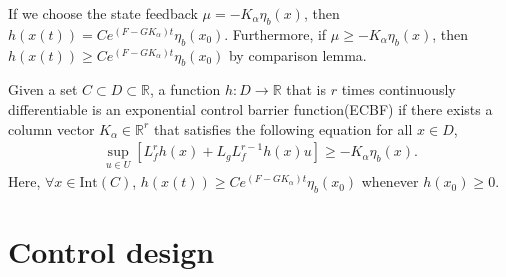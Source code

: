 If we choose the state feedback $ \mu = - K_{\alpha} \eta_b (x) $, then $ h(x(t)) = C e^{(F - GK_{\alpha})t} \eta_b (x_0) $.
Furthermore, if $ \mu \geq -K_{\alpha} \eta_b (x) $, then $ h(x(t)) \geq C e^{(F - GK_{\alpha})t} \eta_b (x_0) $ by comparison lemma.

\begin{definition}
    Given a set $ C \subset D \subset \mathbb{R} $, a function $ h : D \rightarrow \mathbb{R} $ that is $ r $ times continuously differentiable is an exponential control barrier function(ECBF) if there exists a column vector $ K_{\alpha} \in \mathbb{R}^r $ that satisfies the following equation for all $ x \in D $,
    \begin{align}
        \label{eq:definition_of_ECBF}
        \sup_{u \in U} [ L_f^r h(x) + L_g L_f^{r-1} h(x) u] \geq - K_{\alpha} \eta_b (x).
    \end{align}
    Here, $ \forall x \in \mathrm{Int} (C) $, $ h(x(t)) \geq C e^{(F - GK_{\alpha})t} \eta_b (x_0) $ whenever $ h(x_0) \geq 0 $.
\end{definition}

\section{Control design}
\label{sec:control_design}
